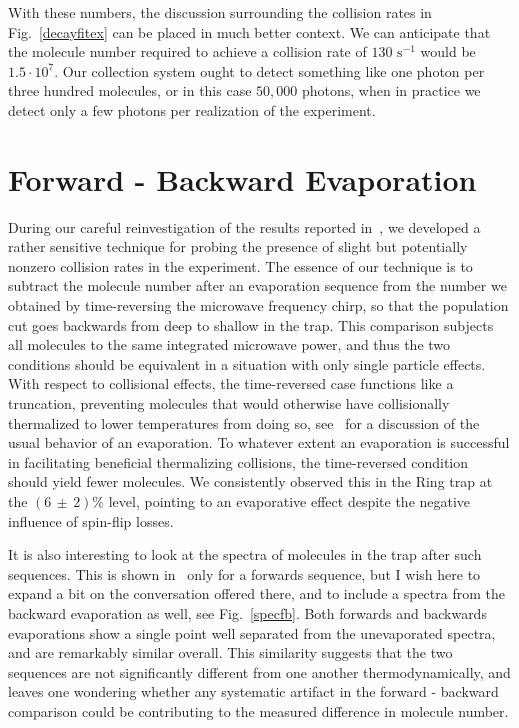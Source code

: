 With these numbers, the discussion surrounding the collision rates in Fig.~\ref{decayfitex} can be placed in much better context.
We can anticipate that the molecule number required to achieve a collision rate of $130\text{ s}^{-1}$ would be $1.5\cdot10^7$.
Our collection system ought to detect something like one photon per three hundred molecules, or in this case $50,000$ photons, when in practice we detect only a few photons per realization of the experiment.

\section{Forward - Backward Evaporation}

During our careful reinvestigation of the results reported in~\cite{Stuhl2012evap}, we developed a rather sensitive technique for probing the presence of slight but potentially nonzero collision rates in the experiment.
The essence of our technique is to subtract the molecule number after an evaporation sequence from the number we obtained by time-reversing the  microwave frequency chirp, so that the population cut goes backwards from deep to shallow in the trap.
This comparison subjects all molecules to the same integrated microwave power, and thus the two conditions should be equivalent in a situation with only single particle effects.
With respect to collisional effects, the time-reversed case functions like a truncation, preventing molecules that would otherwise have collisionally thermalized to lower temperatures from doing so, see~\cite{Luiten1996} for a discussion of the usual behavior of an evaporation.
To whatever extent an evaporation is successful in facilitating beneficial thermalizing collisions, the time-reversed condition should yield fewer molecules.
We consistently observed this in the Ring trap at the $(6\,{\pm}\,2)\%$ level, pointing to an evaporative effect despite the negative influence of spin-flip losses.

It is also interesting to look at the spectra of molecules in the trap after such sequences. 
This is shown in~\citep[App.~B]{Reens2017} only for a forwards sequence, but I wish here to expand a bit on the conversation offered there, and to include a spectra from the backward evaporation as well, see Fig.~\ref{specfb}.
Both forwards and backwards evaporations show a single point well separated from the unevaporated spectra, and are remarkably similar overall.
This similarity suggests that the two sequences are not significantly different from one another thermodynamically, and leaves one wondering whether any systematic artifact in the forward - backward comparison could be contributing to the measured difference in molecule number.

